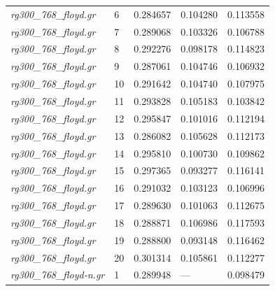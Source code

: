 \documentclass[12pt]{article}
\begin{document}
\begin{longtable}{l|l|lll}
\textit{rg300\_768\_floyd.gr}    &  6        & 0.284657               & 0.104280             & 0.113558                     \\
\textit{rg300\_768\_floyd.gr}    &  7        & 0.289068               & 0.103326             & 0.106788                     \\
\textit{rg300\_768\_floyd.gr}    &  8        & 0.292276               & 0.098178             & 0.114823                     \\
\textit{rg300\_768\_floyd.gr}    &  9        & 0.287061               & 0.104746             & 0.106932                     \\
\textit{rg300\_768\_floyd.gr}    &  10       & 0.291642               & 0.104740             & 0.107975                     \\
\textit{rg300\_768\_floyd.gr}    &  11       & 0.293828               & 0.105183             & 0.103842                     \\
\textit{rg300\_768\_floyd.gr}    &  12       & 0.295847               & 0.101016             & 0.112194                     \\
\textit{rg300\_768\_floyd.gr}    &  13       & 0.286082               & 0.105628             & 0.112173                     \\
\textit{rg300\_768\_floyd.gr}    &  14       & 0.295810               & 0.100730             & 0.109862                     \\
\textit{rg300\_768\_floyd.gr}    &  15       & 0.297365               & 0.093277             & 0.116141                     \\
\textit{rg300\_768\_floyd.gr}    &  16       & 0.291032               & 0.103123             & 0.106996                     \\
\textit{rg300\_768\_floyd.gr}    &  17       & 0.289630               & 0.101063             & 0.112675                     \\
\textit{rg300\_768\_floyd.gr}    &  18       & 0.288871               & 0.106986             & 0.117593                     \\
\textit{rg300\_768\_floyd.gr}    &  19       & 0.288800               & 0.093148             & 0.116462                     \\
\textit{rg300\_768\_floyd.gr}    &  20       & 0.301314               & 0.105861             & 0.112277                     \\ \hline              
\textit{rg300\_768\_floyd-n.gr}  &  1        & 0.289948               & ---                  & 0.098479                   \\

\end{longtable}
\end{document}
